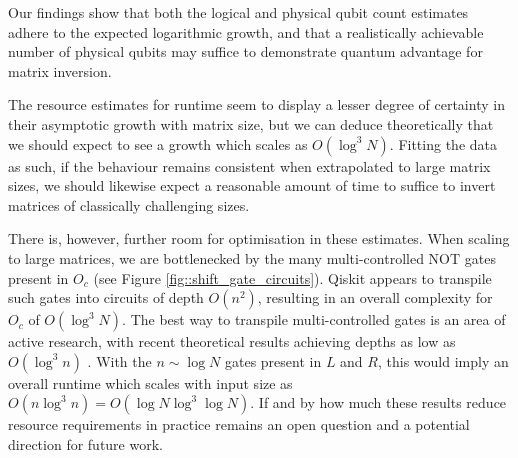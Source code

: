 \documentclass[10pt, twocolumn]{article}
\begin{document}
Our findings show that both the logical and physical qubit count estimates adhere to the expected logarithmic growth, and that a realistically achievable number of physical qubits may suffice to demonstrate quantum advantage for matrix inversion.

The resource estimates for runtime seem to display a lesser degree of certainty in their asymptotic growth with matrix size, but we can deduce theoretically that we should expect to see a growth which scales as $O(\log^3{N})$. Fitting the data as such, if the behaviour remains consistent when extrapolated to large matrix sizes, we should likewise expect a reasonable amount of time to suffice to invert matrices of classically challenging sizes.

There is, however, further room for optimisation in these estimates. When scaling to large matrices, we are bottlenecked by the many multi-controlled \textsc{NOT} gates present in $O_c$ (see Figure \ref{fig::shift_gate_circuits}). Qiskit appears to transpile such gates into circuits of depth $O(n^2)$, resulting in an overall complexity for $O_c$ of $O(\log^3{N})$. The best way to transpile multi-controlled gates is an area of active research, with recent theoretical results achieving depths as low as $O(\log^3{n})$ \cite{claudon2024polylogarithmic}. With the $n \sim \log{N}$ gates present in $L$ and $R$, this would imply an overall runtime which scales with input size as $O(n \log^3{n}) = O(\log{N} \log^3{\log{N}} )$. If and by how much these results reduce resource requirements in practice remains an open question and a potential direction for future work.

\printbibliography
\end{document}
